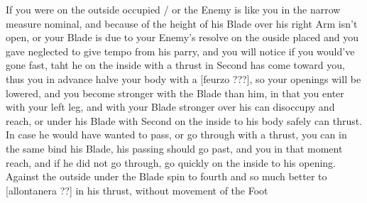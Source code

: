 If you were on the outside occupied / or the Enemy is like you in the
narrow measure nominal, and because of the height of his Blade over
his right Arm isn't open, or your Blade is due to your Enemy's resolve
on the ouside placed and you gave neglected to give tempo from his
parry, and you will notice if you would've gone fast, taht he on the
inside with a thrust in Second has come toward you, thus you in
advance halve your body with a [feurzo ???],
so your openings will be lowered, and you become stronger with the
Blade than him, in that you enter with your left leg,
and with your Blade stronger over his can disoccupy and reach, or
under his Blade with Second on the inside to his body safely can
thrust. In case he would have wanted to pass, or go through with a
thrust, you can in the same bind his Blade, his passing should go
past, and you in that moment reach, and if he did not go through, go
quickly on the inside to his opening.
Against the outside under the Blade spin to fourth and so much
better to [allontanera ??] in his thrust, without movement of the Foot
